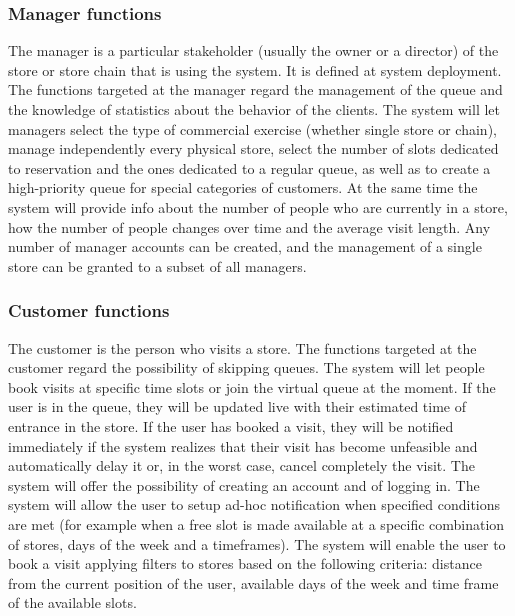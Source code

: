\subsubsection{Manager functions}
The manager is a particular stakeholder (usually the owner or a director) of the store or store chain that is using the system.
It is defined at system deployment.
The functions targeted at the manager regard the management of the queue and the knowledge of statistics about the behavior of the clients.
The system will let managers select the type of commercial exercise (whether single store or chain), manage independently every physical store, select the number of slots dedicated to reservation and the ones dedicated to a regular queue, as well as to create a high-priority queue for special categories of customers.
At the same time the system will provide info about the number of people who are currently in a store,
how the number of people changes over time and the average visit length.
Any number of manager accounts can be created, and the management of a single store can be granted to a subset of all managers.

\subsubsection{Customer functions}
The customer is the person who visits a store.
The functions targeted at the customer regard the possibility of skipping queues.
The system will let people book visits at specific time slots or join the virtual queue at the moment.
If the user is in the queue, they will be updated live with their estimated time of entrance in the store.
If the user has booked a visit, they will be notified immediately if the system realizes that
their visit has become unfeasible and automatically delay it or, in the worst case, cancel completely the visit.
The system will offer the possibility of creating an account and of logging in.
The system will allow the user to setup ad-hoc notification when specified conditions are met (for example when a free slot is made available at a specific combination of stores, days of the week and a timeframes).
The system will enable the user to book a visit applying filters to stores based on the following criteria: distance from the current position of the user, available days of the week and time frame of the available slots.  


